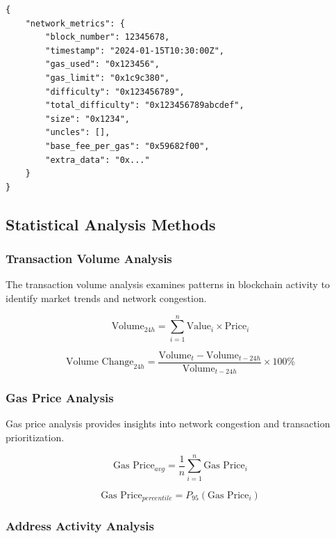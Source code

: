 \documentclass[12pt,a4paper]{article}
\begin{document}
\begin{lstlisting}
{
    "network_metrics": {
        "block_number": 12345678,
        "timestamp": "2024-01-15T10:30:00Z",
        "gas_used": "0x123456",
        "gas_limit": "0x1c9c380",
        "difficulty": "0x123456789",
        "total_difficulty": "0x123456789abcdef",
        "size": "0x1234",
        "uncles": [],
        "base_fee_per_gas": "0x59682f00",
        "extra_data": "0x..."
    }
}
\end{lstlisting}

\subsection{Statistical Analysis Methods}

\subsubsection{Transaction Volume Analysis}

The transaction volume analysis examines patterns in blockchain activity to identify market trends and network congestion.

\begin{equation}
\text{Volume}_{24h} = \sum_{i=1}^{n} \text{Value}_i \times \text{Price}_i
\end{equation}

\begin{equation}
\text{Volume Change}_{24h} = \frac{\text{Volume}_{t} - \text{Volume}_{t-24h}}{\text{Volume}_{t-24h}} \times 100\%
\end{equation}

\subsubsection{Gas Price Analysis}

Gas price analysis provides insights into network congestion and transaction prioritization.

\begin{equation}
\text{Gas Price}_{avg} = \frac{1}{n} \sum_{i=1}^{n} \text{Gas Price}_i
\end{equation}

\begin{equation}
\text{Gas Price}_{percentile} = P_{95}(\text{Gas Price}_i)
\end{equation}

\subsubsection{Address Activity Analysis}
\end{document}
